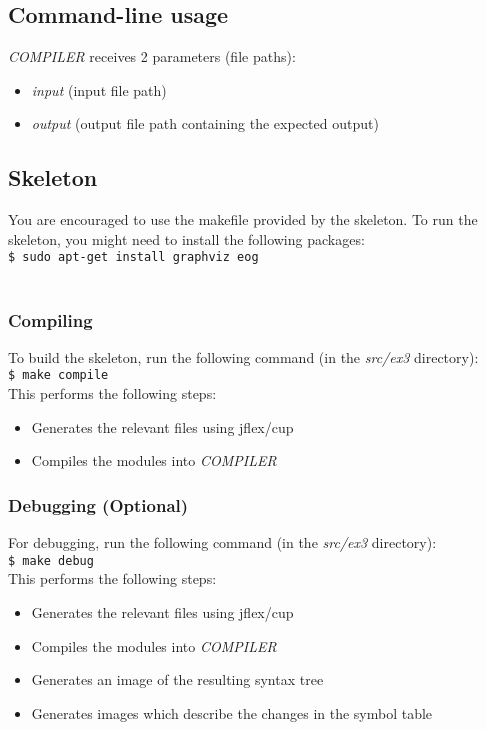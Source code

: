 \documentclass{article}
\begin{document}
\subsection{Command-line usage}
\textit{COMPILER} receives 2 parameters (file paths):
\begin{itemize}
    \item \textit{input} (input file path)
    \item \textit{output} (output file path containing the expected output)
\end{itemize}

\subsection{Skeleton}
You are encouraged to use the makefile provided by the skeleton.
To run the skeleton, you might need to install the following packages: \\
\texttt{\$ sudo apt-get install graphviz eog} \\ \\
\subsubsection{Compiling}
To build the skeleton, run the following command (in the \textit{src/ex3} directory): \\
\texttt{\$ make compile} \\
This performs the following steps:
\begin{itemize}
    \item Generates the relevant files using jflex/cup
    \item Compiles the modules into \textit{COMPILER}
\end{itemize}

\subsubsection{Debugging (Optional)}
For debugging, run the following command (in the \textit{src/ex3} directory): \\
\texttt{\$ make debug} \\
This performs the following steps:
\begin{itemize}
    \item Generates the relevant files using jflex/cup
    \item Compiles the modules into \textit{COMPILER}
    \item Generates an image of the resulting syntax tree
    \item Generates images which describe the changes in the symbol table
\end{itemize}
\end{document}
